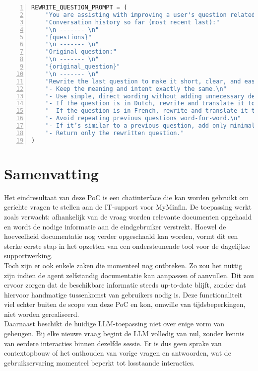 \begin{lstlisting}[basicstyle=\small, frame=single, breaklines=true, postbreak=\mbox{\textcolor{red}{$\hookrightarrow$}\space}, escapeinside ={\%,}, escapechar={!}, numbers=left, language=Python, caption=Beoordeling documenten prompt]
REWRITE_QUESTION_PROMPT = (
    "You are assisting with improving a user's question related to Myminfin IT support.\n"
    "Conversation history so far (most recent last):"
    "\n ------- \n"
    "{questions}"
    "\n ------- \n"
    "Original question:"
    "\n ------- \n"
    "{original_question}"
    "\n ------- \n"
    "Rewrite the last question to make it short, clear, and easy to match with relevant documents in a vector database.\n"
    "- Keep the meaning and intent exactly the same.\n"
    "- Use simple, direct wording without adding unnecessary details.\n"
    "- If the question is in Dutch, rewrite and translate it to French.\n"
    "- If the question is in French, rewrite and translate it to English.\n"
    "- Avoid repeating previous questions word-for-word.\n"
    "- If it’s similar to a previous question, add only minimal context needed for distinction.\n"
    "- Return only the rewritten question."
)
\end{lstlisting}
\section{Samenvatting}


Het eindresultaat van deze PoC is een chatinterface die kan worden gebruikt om gerichte vragen te stellen aan de IT-support voor MyMinfin. De toepassing werkt zoals verwacht: afhankelijk van de vraag worden relevante documenten opgehaald en wordt de nodige informatie aan de eindgebruiker verstrekt. Hoewel de hoeveelheid documentatie nog verder opgeschaald kan worden, vormt dit een sterke eerste stap in het opzetten van een ondersteunende tool voor de dagelijkse supportwerking.
\\[1em]
Toch zijn er ook enkele zaken die momenteel nog ontbreken. Zo zou het nuttig zijn indien de agent zelfstandig documentatie kan aanpassen of aanvullen. Dit zou ervoor zorgen dat de beschikbare informatie steeds up-to-date blijft, zonder dat hiervoor handmatige tussenkomst van gebruikers nodig is. Deze functionaliteit viel echter buiten de scope van deze PoC en kon, omwille van tijdsbeperkingen, niet worden gerealiseerd.
\\[1em]
Daarnaast beschikt de huidige LLM-toepassing niet over enige vorm van geheugen. Bij elke nieuwe vraag begint de LLM volledig van nul, zonder kennis van eerdere interacties binnen dezelfde sessie. Er is dus geen sprake van contextopbouw of het onthouden van vorige vragen en antwoorden, wat de gebruikservaring momenteel beperkt tot losstaande interacties.